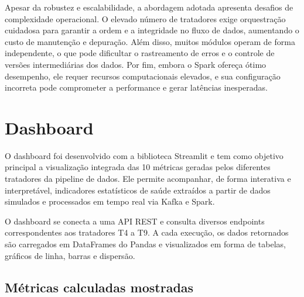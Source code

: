 \documentclass[a4paper,12pt]{article}
\begin{document}
Apesar da robustez e escalabilidade, a abordagem adotada apresenta desafios de complexidade operacional. O elevado número de tratadores exige orquestração cuidadosa para garantir a ordem e a integridade no fluxo de dados, aumentando o custo de manutenção e depuração. Além disso, muitos módulos operam de forma independente, o que pode dificultar o rastreamento de erros e o controle de versões intermediárias dos dados. Por fim, embora o Spark ofereça ótimo desempenho, ele requer recursos computacionais elevados, e sua configuração incorreta pode comprometer a performance e gerar latências inesperadas.



\section{Dashboard}

O dashboard foi desenvolvido com a biblioteca Streamlit e tem como objetivo principal a visualização integrada das 10 métricas geradas pelos diferentes tratadores da pipeline de dados. Ele permite acompanhar, de forma interativa e interpretável, indicadores estatísticos de saúde extraídos a partir de dados simulados e processados em tempo real via Kafka e Spark.

O dashboard se conecta a uma API REST  e consulta diversos endpoints correspondentes aos tratadores T4 a T9. A cada execução, os dados retornados são carregados em DataFrames do Pandas e visualizados em forma de tabelas, gráficos de linha, barras e dispersão.


\subsection*{Métricas calculadas mostradas}
\end{document}
